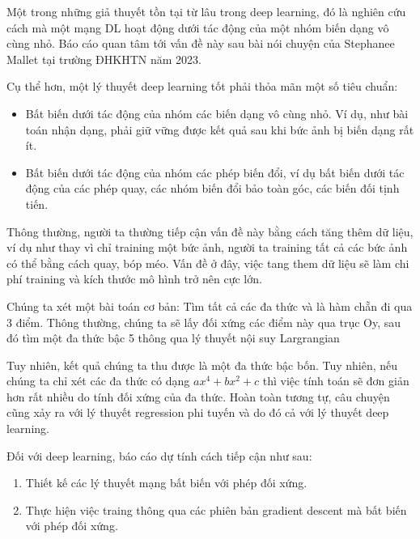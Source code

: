 Một trong những giả thuyết tồn tại từ lâu trong deep learning, đó là nghiên cứu cách mà  một mạng DL hoạt động dưới tác động của một nhóm  biến dạng vô cùng nhỏ. Báo cáo quan tâm tới vấn đề này sau bài nói chuyện của Stephanee Mallet tại trường ĐHKHTN năm 2023.

Cụ thể hơn, một lý thuyết deep learning tốt phải thỏa mãn một số tiêu chuẩn:
\begin{itemize}
    \item Bất biến dưới tác động của nhóm các biến dạng vô cùng nhỏ. Ví dụ, như bài toán nhận dạng, phải giữ vững được kết quả sau khi bức ảnh bị biến dạng rất ít.
    \item Bất biến dưới tác động của nhóm các phép biến đổi, ví dụ bất biến dưới tác động của các phép quay, các nhóm biến đổi bảo toàn góc, các biến đối tịnh tiến.

\end{itemize}

Thông thường, người ta thường tiếp cận vấn đề này bằng cách tăng thêm dữ liệu, ví dụ như thay vì chỉ training một bức ảnh, người ta training tất cả các bức ảnh có thể bằng cách quay, bóp méo. Vấn đề ở đây, việc tang them dữ liệu sẽ làm chi phí training và kích thước mô hình trở nên cực lớn.

Chúng ta xét một bài toán cơ bản: Tìm tất cả các đa thức và là hàm chẵn đi qua 3 điểm.
Thông thường, chúng ta sẽ lấy đối xứng các điểm này qua trục Oy, sau đó tìm một đa thức bậc 5  thông qua lý thuyết nội suy Largrangian

\begin{center}
\end{center}

Tuy nhiên, kết quả chúng ta thu được là một đa thức bậc bốn. Tuy nhiên, nếu chúng ta chỉ xét các đa thức có dạng $ax^4+bx^2+c$ thì việc tính toán sẽ đơn giản hơn rất nhiều do tính đối xứng của đa thức.
Hoàn toàn tương tự, câu chuyện cũng xảy ra với lý thuyết regression phi tuyến và do đó cả với lý thuyết deep learning.

Đối với deep learning, báo cáo dự tính cách tiếp cận như sau:
\begin{enumerate}
    \item Thiết kế các lý thuyết mạng bất biến với phép đối xứng.
    \item Thực hiện việc traing thông qua các phiên bản gradient descent mà bất biến với phép đối xứng.
\end{enumerate}


